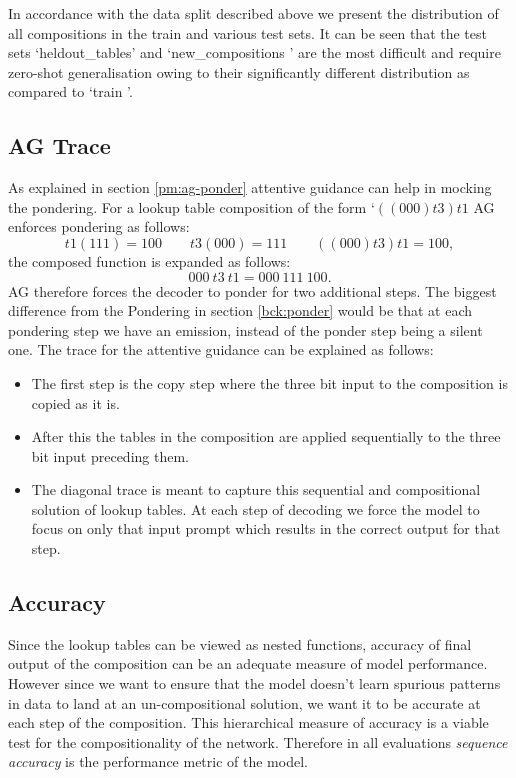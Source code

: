 In accordance with the data split described above we present the distribution of all compositions in the train and various test sets. It can be seen that the test sets \lq heldout\_tables\rq{} and \lq new\_compositions \rq{} are the most difficult and require zero-shot generalisation owing to their significantly different distribution as compared to \lq train \rq{}.

\subsection{AG Trace}\label{lt:ponder}
As explained in section \ref{pm:ag-ponder} attentive guidance can help in mocking the pondering. For a lookup table composition of the form \lq $((000)t3)t1$ AG enforces pondering as follows:
\begin{equation}
t1(111) = 100 \qquad t3(000) = 111 \qquad ((000)t3)t1 = 100,
\end{equation}
the composed function is expanded as follows:
\begin{equation}
000\ t3\ t1 = 000\ 111\ 100.
\end{equation}
AG therefore forces the decoder to ponder for two additional steps. The biggest difference from the Pondering in section \ref{bck:ponder} would be that at each pondering step we have an emission, instead of the ponder step being a silent one. The trace for the attentive guidance can be explained as follows:
\begin{itemize}
	\item The first step is the copy step where the three bit input to the composition is copied as it is.
	\item After this the tables in the composition are applied sequentially to the three bit input preceding them.
	\item The diagonal trace is meant to capture this sequential and compositional solution of lookup tables. At each step of decoding we force the model to focus on only that input prompt which results in the correct output for that step.
\end{itemize}


\subsection{Accuracy}
Since the lookup tables can be viewed as nested functions, accuracy of final output of the composition can be an adequate measure of model performance. However since we want to ensure that the model doesn't learn spurious patterns in data to land at an un-compositional solution, we want it to be accurate at each step of the composition. This hierarchical measure of accuracy is a viable test for the compositionality of the network. Therefore in all evaluations \textit{sequence accuracy} is the performance metric of the model.

